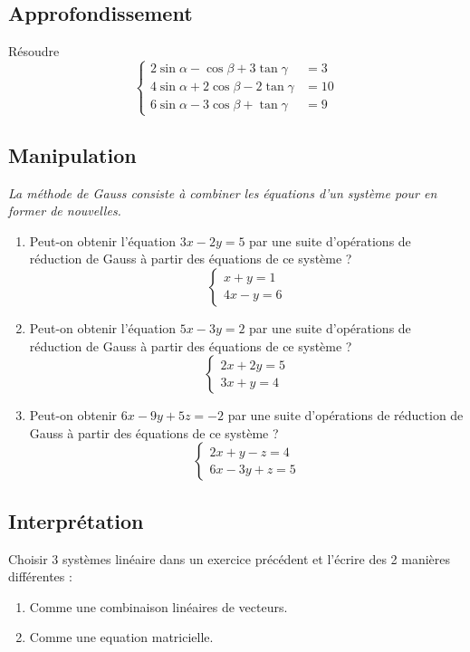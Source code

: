 \documentclass[11pt,a4paper]{report}
\begin{document}
\subsection{Approfondissement}
Résoudre 
$$\begin{cases}
    2 \sin \alpha-\cos \beta+3 \tan \gamma &= 3 \\
    4 \sin \alpha+2 \cos \beta-2 \tan \gamma &= 10 \\
    6 \sin \alpha-3 \cos \beta+\tan \gamma &= 9
  \end{cases}$$

  \newpage
  \vspace{2em}

\subsection{Manipulation}

\textit{La méthode de Gauss consiste à combiner les équations d'un système pour en former de nouvelles.}

\medskip
\begin{enumerate}[label=\alph*)]
\item Peut-on obtenir l'équation \(3x - 2y = 5\) par une suite d'opérations de réduction de Gauss à partir des équations de ce système ?
\[
\begin{cases}
x + y = 1 \\
4x - y = 6
\end{cases}
\]

\item Peut-on obtenir l'équation \(5x - 3y = 2\) par une suite d'opérations de réduction de Gauss à partir des équations de ce système ?
\[
\begin{cases}
2x + 2y = 5 \\
3x + y = 4
\end{cases}
\]

\item Peut-on obtenir \(6x - 9y + 5z = -2\) par une suite d'opérations de réduction de Gauss à partir des équations de ce système ?
\[
\begin{cases}
2x + y - z = 4 \\
6x - 3y + z = 5
\end{cases}
\]
\end{enumerate}

\vspace{2em}
\subsection{Interprétation}
Choisir 3 systèmes linéaire dans un exercice précédent et l'écrire des 2 manières différentes : 
\begin{enumerate}
  \item Comme une combinaison linéaires de vecteurs.
  \item Comme une equation matricielle.
\end{enumerate}
\end{document}
